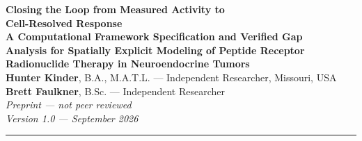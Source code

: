 \documentclass[11pt]{article}
\begin{document}
\begin{center}
  {\LARGE\bfseries Closing the Loop from Measured Activity to\\
   Cell-Resolved Response}\\[10pt]
  {\large\bfseries A Computational Framework Specification and Verified Gap\\
   Analysis for Spatially Explicit Modeling of Peptide Receptor\\
   Radionuclide Therapy in Neuroendocrine Tumors}\\[14pt]
  {\normalsize
    \textbf{Hunter Kinder}, B.A., M.A.T.L. --- Independent Researcher, Missouri, USA\\[2pt]
    \textbf{Brett Faulkner}, B.Sc. --- Independent Researcher\\[10pt]
  }
  {\small
    \textit{Preprint --- not peer reviewed}\\
    \textit{Version 1.0 --- September 2026}
  }
\end{center}
\vspace{4pt}
\noindent\rule{\linewidth}{0.5pt}
\vspace{2pt}
\end{document}

